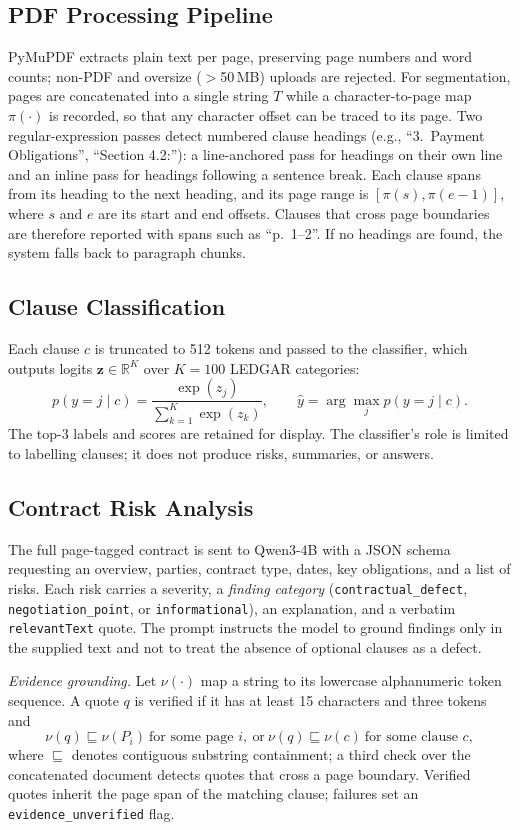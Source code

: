 \documentclass[conference]{IEEEtran}
\begin{document}
\subsection{PDF Processing Pipeline}
PyMuPDF extracts plain text per page, preserving page numbers and word counts; non-PDF and oversize ($>$50\,MB) uploads are rejected. For segmentation, pages are concatenated into a single string $T$ while a character-to-page map $\pi(\cdot)$ is recorded, so that any character offset can be traced to its page. Two regular-expression passes detect numbered clause headings (e.g., ``3.~Payment Obligations'', ``Section 4.2:''): a line-anchored pass for headings on their own line and an inline pass for headings following a sentence break. Each clause spans from its heading to the next heading, and its page range is $[\pi(s),\pi(e-1)]$, where $s$ and $e$ are its start and end offsets. Clauses that cross page boundaries are therefore reported with spans such as ``p.~1--2''. If no headings are found, the system falls back to paragraph chunks.

\subsection{Clause Classification}
Each clause $c$ is truncated to 512 tokens and passed to the classifier, which outputs logits $\mathbf{z}\in\mathbb{R}^{K}$ over $K=100$ LEDGAR categories:
\begin{equation}
p(y=j\mid c)=\frac{\exp(z_j)}{\sum_{k=1}^{K}\exp(z_k)},\qquad \hat{y}=\arg\max_j p(y=j\mid c).
\end{equation}
The top-3 labels and scores are retained for display. The classifier's role is limited to labelling clauses; it does not produce risks, summaries, or answers.

\subsection{Contract Risk Analysis}
The full page-tagged contract is sent to Qwen3-4B with a JSON schema requesting an overview, parties, contract type, dates, key obligations, and a list of risks. Each risk carries a severity, a \emph{finding category} (\texttt{contractual\_defect}, \texttt{negotiation\_point}, or \texttt{informational}), an explanation, and a verbatim \texttt{relevantText} quote. The prompt instructs the model to ground findings only in the supplied text and not to treat the absence of optional clauses as a defect.

\textit{Evidence grounding.} Let $\nu(\cdot)$ map a string to its lowercase alphanumeric token sequence. A quote $q$ is verified if it has at least 15 characters and three tokens and
\begin{equation}
\nu(q)\sqsubseteq\nu(P_i)\ \text{for some page } i,\ \text{or}\ \nu(q)\sqsubseteq\nu(c)\ \text{for some clause } c,
\label{eq:ground}
\end{equation}
where $\sqsubseteq$ denotes contiguous substring containment; a third check over the concatenated document detects quotes that cross a page boundary. Verified quotes inherit the page span of the matching clause; failures set an \texttt{evidence\_unverified} flag.
\end{document}
